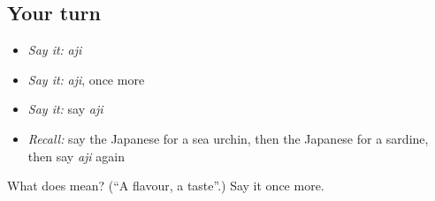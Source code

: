 \subsection*{Your turn}
\begin{itemize}
\raggedright
  \item \emph{Say it:} \emph{aji}
  \item \emph{Say it:} \emph{aji}, once more
  \item \emph{Say it:} say \emph{aji}
  \item \emph{Recall:} say the Japanese for a sea urchin, then the Japanese for a sardine, then say \emph{aji} again
\end{itemize}

\begin{tcolorbox}[breakable,colback=teal!4,colframe=teal!35!black,title={Before you move on}]
What does  mean? (\textquotedblleft{}A flavour, a taste\textquotedblright{}.) Say it once more.
\end{tcolorbox}
